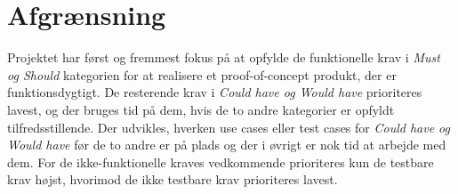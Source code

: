 \chapter{Afgrænsning}
Projektet har først og fremmest fokus på at opfylde de funktionelle krav i \textit{Must og Should} kategorien for at realisere et proof-of-concept produkt, der er funktionsdygtigt. De resterende krav i \textit{Could have og Would have} prioriteres lavest, og der bruges tid på dem, hvis de to andre kategorier er opfyldt tilfredsstillende. Der udvikles, hverken use cases eller test cases for \textit{Could have og Would have} før de to andre er på plads og der i øvrigt er nok tid at arbejde med dem. For de ikke-funktionelle kraves vedkommende prioriteres kun de testbare krav højst, hvorimod de ikke testbare krav prioriteres lavest.       